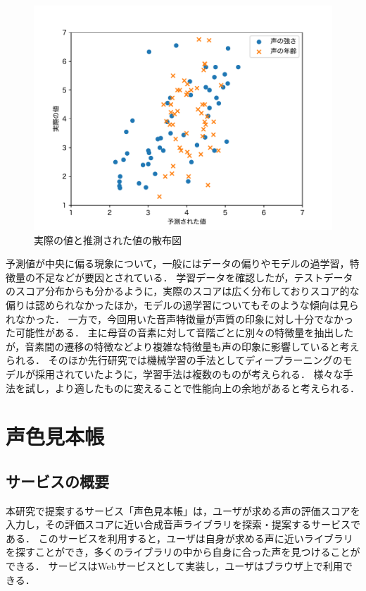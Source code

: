 \documentclass[a4j,8pt,twocolumn]{extarticle}
\begin{document}
\begin{figure}[h]
  \centering
  \includegraphics[width=\linewidth]{fig/scatter.pdf}
  \caption{実際の値と推測された値の散布図}
  \label{fig:scatter}
\end{figure}

予測値が中央に偏る現象について，一般にはデータの偏りやモデルの過学習，特徴量の不足などが要因とされている．
学習データを確認したが，テストデータのスコア分布からも分かるように，実際のスコアは広く分布しておりスコア的な偏りは認められなかったほか，モデルの過学習についてもそのような傾向は見られなかった．
一方で，今回用いた音声特徴量が声質の印象に対し十分でなかった可能性がある．
主に母音の音素に対して音階ごとに別々の特徴量を抽出したが，音素間の遷移の特徴などより複雑な特徴量も声の印象に影響していると考えられる．
そのほか先行研究\cite{dnn}では機械学習の手法としてディープラーニングのモデルが採用されていたように，学習手法は複数のものが考えられる．
様々な手法を試し，より適したものに変えることで性能向上の余地があると考えられる．

\section{声色見本帳}
\subsection{サービスの概要}
本研究で提案するサービス「声色見本帳」は，ユーザが求める声の評価スコアを入力し，その評価スコアに近い合成音声ライブラリを探索・提案するサービスである．
このサービスを利用すると，ユーザは自身が求める声に近いライブラリを探すことができ，多くのライブラリの中から自身に合った声を見つけることができる．
サービスはWebサービスとして実装し，ユーザはブラウザ上で利用できる．
\end{document}
